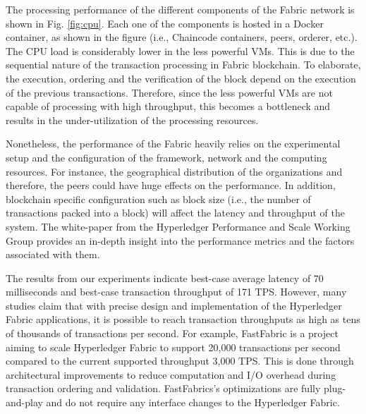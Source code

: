 \documentclass[conference]{IEEEtran}
\begin{document}
The processing performance of the different components of the Fabric network is shown in Fig.  \ref{fig:cpu}. Each one of the components is hosted in a Docker container, as shown in the figure (i.e., Chaincode containers, peers, orderer, etc.). The CPU load is considerably lower in the less powerful VMs. This is due to the sequential nature of the transaction processing in Fabric blockchain. To elaborate, the execution, ordering and the verification of the block depend on the execution of the previous transactions. Therefore, since the less powerful VMs are not capable of processing with high throughput, this becomes a bottleneck and results in the under-utilization of the processing resources. 


Nonetheless, the performance of the Fabric heavily relies on the experimental setup and the configuration of the framework, network and the computing resources. For instance, the geographical distribution of the organizations and therefore, the peers could have huge effects on the performance. In addition, blockchain specific configuration such as block size (i.e., the number of transactions packed into a block) \cite{DBLP:journals/corr/abs-1805-11390} will affect the latency and throughput of the system. The white-paper \cite{hgperf} from the Hyperledger Performance and Scale Working Group \cite{pswg} provides an in-depth insight into the performance metrics and the factors associated with them.

The results from our experiments indicate best-case average latency of 70 milliseconds and best-case transaction throughput of 171 TPS. However, many studies claim that with precise design and implementation of the Hyperledger Fabric applications, it is possible to reach transaction throughputs as high as tens of thousands of transactions per second. For example, FastFabric \cite{fastFabric} is a project aiming to scale Hyperledger Fabric to support 20,000 transactions per second compared to the current supported throughput 3,000 TPS. This is done through architectural improvements to reduce computation and I/O overhead during transaction ordering and validation. FastFabrics's optimizations are fully plug-and-play and do not require any interface changes to the Hyperledger Fabric.
\end{document}
